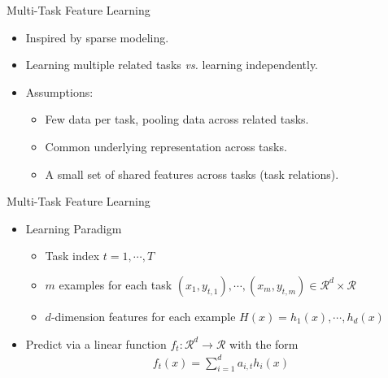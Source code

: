 \documentclass[first=dgreen,second=purple,logo=yellowexc]{aaltoslides}
\begin{document}
\begin{frame}{Multi-Task Feature Learning}
\begin{itemize}
    \item Inspired by sparse modeling.
    \item Learning multiple related tasks {\em vs.} learning independently. 
    \item Assumptions:
    \begin{itemize}
        \item Few data per task, pooling data across related tasks.
        \item Common underlying representation across tasks.
        \item A small set of shared features across tasks (task relations).
    \end{itemize}
\end{itemize}
\end{frame}

\begin{frame}{Multi-Task Feature Learning }
\begin{itemize}
    \item Learning Paradigm
    \begin{itemize} 
        \item Task index $t=1,\cdots,T$ 
        \item $m$ examples for each task $(x_1,y_{t,1}),\cdots,(x_m,y_{t,m})\in\mathcal{R}^d\times\mathcal{R}$
        \item $d$-dimension features for each example $H(x)=h_1(x),\cdots,h_d(x)$
    \end{itemize}
    \item Predict via a linear function $f_t:\mathcal{R}^d\rightarrow\mathcal{R}$ with the form
    \begin{align*}
        f_t(x)=\sum_{i=1}^{d}a_{i,t}h_i(x)
    \end{align*}
\end{itemize}
\end{frame}
\end{document}
